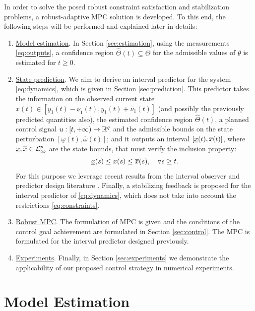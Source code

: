 \documentclass[letterpaper, 10 pt, conference]{ieeeconf}  %
\begin{document}
In order to solve the posed robust constraint satisfaction and stabilization
problems, a robust-adaptive MPC solution \cite{Fukushima2007,Adetola2009,Adetola2011}
is developed. To this end, the following steps will be performed
and explained later in details:
\begin{enumerate}
\item \uline{Model estimation}. In Section \ref{sec:estimation}, using
the measurements \eqref{eq:outputs}, a confidence region $\hat{\Theta}(t)\subseteq\Theta$
for the admissible values of $\theta$ is estimated for $t\geq0$.
\item \uline{State prediction}. We aim to derive an interval predictor
\cite{Dinh2014,leurent2019interval} for the system \eqref{eq:dynamics},
which is given in Section \ref{sec:prediction}. This predictor takes
the information on the observed current state $x(t)\in[y_{1}(t)-\underline{\nu}_{1}(t),y_{1}(t)+\overline{\nu}_{1}(t)]$
(and possibly the previously predicted quantities
also), the estimated confidence region $\hat{\Theta}(t)$, a planned
control signal $u:[t,+\infty)\to\mathbb{R}^{q}$ and the admissible bounds
on the state perturbation $[\underline{\omega}(t),\overline{\omega}(t)]$;
and it outputs an interval $[\underline{x}(t),\overline{x}(t)]$, where $\underline{x},\overline{x}\in\mathcal{L}_{\infty}^{p}$
are the state bounds, that must verify the inclusion property: 
\begin{equation}
\underline{x}(s)\leq x(s)\leq\overline{x}(s),\quad\forall s\geq t.\label{eq:inclusion-generic}
\end{equation}
For this purpose we leverage recent results from the interval observer
and predictor design literature \cite{Dinh2014,leurent2019interval}.
Finally, a stabilizing feedback is proposed for the interval predictor
of \eqref{eq:dynamics}, which does not take into account the restrictions
\eqref{eq:constraints}.
\item \uline{Robust MPC}. The formulation of MPC is given and the conditions
of the control goal achievement are formulated in Section \ref{sec:control}.
The MPC is formulated for the interval predictor designed previously. 
\item \uline{Experiments}. Finally, in Section \ref{sec:experiments}
we demonstrate the applicability of our proposed control strategy
in numerical experiments.
\end{enumerate}

\section{\label{sec:estimation} Model Estimation}
\end{document}
